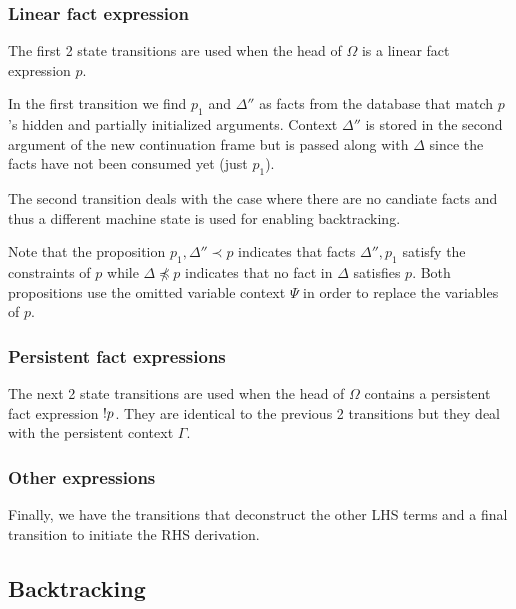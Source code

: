 \subsubsection{Linear fact expression}

The first 2 state transitions are used when the head of $\Omega$ is a linear fact
expression $p$.

In the first transition we find $p_1$ and $\Delta''$ as facts from the database
that match $p$'s hidden and partially initialized arguments.  Context $\Delta''$
is stored in the second argument of the new continuation frame but is passed
along with $\Delta$ since the facts have not been consumed yet (just $p_1$).

The second transition deals with the case where there are no candiate facts and
thus a different machine state is used for enabling backtracking.

Note that the proposition $p_1, \Delta'' \prec p$ indicates that facts
$\Delta'', p_1$ satisfy the constraints of $p$ while $\Delta \npreceq p$
indicates that no fact in $\Delta$ satisfies $p$. Both propositions use the
omitted variable context $\Psi$ in order to replace the variables of $p$.



\subsubsection{Persistent fact expressions}

The next 2 state transitions are used when the head of $\Omega$ contains a
persistent fact expression ${!} p$. They are identical to the previous 2
transitions but they deal with the persistent context $\Gamma$.



\subsubsection{Other expressions}

Finally, we have the transitions that deconstruct the other LHS terms and a
final transition to initiate the RHS derivation.



\subsection{Backtracking}\label{sec:lld_match_cont}

